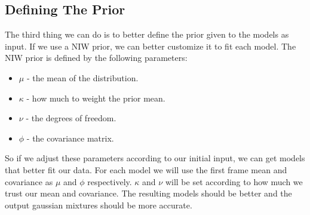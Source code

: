 \subsection{Defining The Prior}\label{subsec:prior}
The third thing we can do is to better define the prior given to the models as input.
If we use a NIW prior, we can better customize it to fit each model.
The NIW prior is defined by the following parameters:
\begin{itemize}
    \item $\mu$ - the mean of the distribution.
    \item $\kappa$ - how much to weight the prior mean.
    \item $\nu$ - the degrees of freedom.
    \item $\phi$ - the covariance matrix.
\end{itemize}
So if we adjust these parameters according to our initial input, we can get models that better fit our data.
For each model we will use the first frame mean and covariance as \texttt{$\mu$} and \texttt{$\phi$} respectively.
$\kappa$ and $\nu$ will be set according to how much we trust our mean and covariance.
The resulting models should be better and the output gaussian mixtures should be more accurate.
\pagebreak
